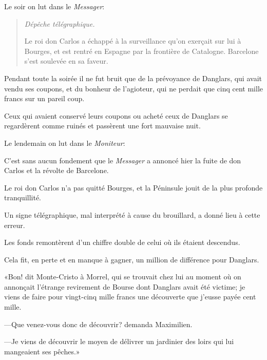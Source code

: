 Le soir on lut dans le \textit{Messager}: 

\begin{quotation}
	
\begin{flushright}\itshape
	Dépêche télégraphique.
\end{flushright}

Le roi don Carlos a échappé à la surveillance qu'on exerçait sur lui à Bourges, et est rentré en Espagne par la frontière de Catalogne. Barcelone s'est soulevée en sa faveur.
\end{quotation}

Pendant toute la soirée il ne fut bruit que de la prévoyance de Danglars, qui avait vendu ses coupons, et du bonheur de l'agioteur, qui ne perdait que cinq cent mille francs sur un pareil coup. 

Ceux qui avaient conservé leurs coupons ou acheté ceux de Danglars se regardèrent comme ruinés et passèrent une fort mauvaise nuit. 

Le lendemain on lut dans le \textit{Moniteur}: 

\begin{newspaper}{}{}
C'est sans aucun fondement que le \textit{Messager} a annoncé hier la fuite de don Carlos et la révolte de Barcelone. 

Le roi don Carlos n'a pas quitté Bourges, et la Péninsule jouit de la plus profonde tranquillité.  

Un signe télégraphique, mal interprété à cause du brouillard, a donné lieu à cette erreur.
\end{newspaper}

Les fonds remontèrent d'un chiffre double de celui où ils étaient descendus. 

Cela fit, en perte et en manque à gagner, un million de différence pour Danglars. 

«Bon! dit Monte-Cristo à Morrel, qui se trouvait chez lui au moment où on annonçait l'étrange revirement de Bourse dont Danglars avait été victime; je viens de faire pour vingt-cinq mille francs une découverte que j'eusse payée cent mille. 

—Que venez-vous donc de découvrir? demanda Maximilien. 

—Je viens de découvrir le moyen de délivrer un jardinier des loirs qui lui mangeaient ses pêches.» 